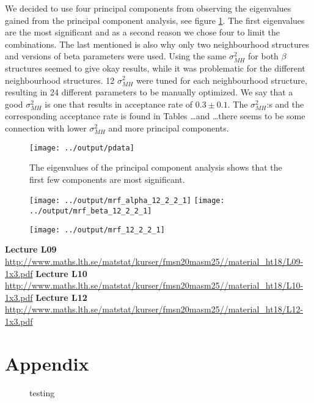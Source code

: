 \documentclass[a4paper,english]{article}
\newcommand{\sexion}[1]{\section{#1}}
\begin{document}
We decided to use four principal components from observing the eigenvalues gained from the principal component analysis, see figure \ref{fig:pca}. The first eigenvalues are the most significant and as a second reason we chose four to limit the combinations. The last mentioned is also why only two neighbourhood structures and versions of beta parameters were used.
Using the same $\sigma_{MH}^2$ for both $\beta$ structures seemed to give okay results, while it was problematic for the different neighbourhood structures. 12 $\sigma_{MH}^2$ were tuned for each neighbourhood structure, resulting in 24 different parameters to be manually optimized.
We say that a good $\sigma_{MH}^2$ is one that results in acceptance rate of $0.3 \pm 0.1$.
The $\sigma_{MH}^2$:s and the corresponding acceptance rate is found in Tables \dots and \dots there seems to be some connection with lower $\sigma_{MH}^2$ and more principal components.

\begin{figure}[H]
	\centering
    \texttt{[image: ../output/pdata]}
    \caption{The eigenvalues of the principal component analysis shows that the first few components are most significant.}
    \label{fig:pca}
\end{figure}

\begin{figure}[H]
  \centering
  \texttt{[image: ../output/mrf\_alpha\_12\_2\_2\_1]}
  \texttt{[image: ../output/mrf\_beta\_12\_2\_2\_1]}
  \caption{}
  \label{fig:alphabeta}
\end{figure}

\begin{figure}[H]
	\centering
    \texttt{[image: ../output/mrf\_12\_2\_2\_1]}
    \caption{}
    \label{fig:mrf}
\end{figure}


\newpage

\begin{thebibliography}{37}
  \textbf{Lecture L09} \\
\url{http://www.maths.lth.se/matstat/kurser/fmsn20masm25//material_ht18/L09-1x3.pdf}
  \textbf{Lecture L10} \\
\url{http://www.maths.lth.se/matstat/kurser/fmsn20masm25//material_ht18/L10-1x3.pdf}
  \textbf{Lecture L12} \\
\url{http://www.maths.lth.se/matstat/kurser/fmsn20masm25//material_ht18/L12-1x3.pdf}
\end{thebibliography}
\pagebreak{}

\sexion{Appendix}
\begin{figure}[H]
  \centering
  \caption{testing}
  \label{fig:test}
\end{figure}


% 


\pagebreak{}
\thispagestyle{empty}
\end{document}
